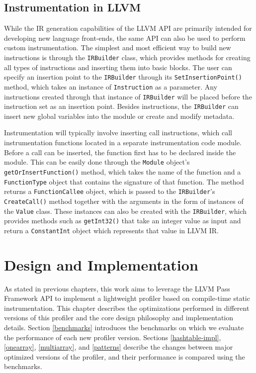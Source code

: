 \section{Instrumentation in LLVM}
While the IR generation capabilities of the LLVM API are primarily intended for developing new language front-ends, the same API can also be used to perform custom instrumentation. The simplest and most efficient way to build new instructions is through the \texttt{IRBuilder} class, which provides methods for creating all types of instructions and inserting them into basic blocks. The user can specify an insertion point to the \texttt{IRBuilder} through its \texttt{SetInsertionPoint()} method, which takes an instance of \texttt{Instruction} as a parameter. Any instructions created through that instance of \texttt{IRBuilder} will be placed before the instruction set as an insertion point. Besides instructions, the \texttt{IRBuilder} can insert new global variables into the module or create and modify metadata.

Instrumentation will typically involve inserting call instructions, which call instrumentation functions located in a separate instrumentation code module. Before a call can be inserted, the function first has to be declared inside the module. This can be easily done through the \texttt{Module} object's \texttt{getOrInsertFunction()} method, which takes the name of the function and a \texttt{FunctionType} object that contains the signature of that function. The method returns a \texttt{FunctionCallee} object, which is passed to the \texttt{IRBuilder}'s \texttt{CreateCall()} method together with the arguments in the form of instances of the \texttt{Value} class. These instances can also be created with the \texttt{IRBuilder}, which provides methods such as \texttt{getInt32()} that take an integer value as input and return a \texttt{ConstantInt} object which represents that value in LLVM IR. 


\chapter{Design and Implementation}
\label{implementation}

As stated in previous chapters, this work aims to leverage the LLVM Pass Framework API to implement a lightweight profiler based on compile-time static instrumentation. This chapter describes the optimizations performed in different versions of this profiler and the core design philosophy and implementation details. Section \ref{benchmarks} introduces the benchmarks on which we evaluate the performance of each new profiler version. Sections \ref{hashtable-impl}, \ref{onearray}, \ref{multiarray}, and \ref{patterns} describe the changes between major optimized versions of the profiler, and their performance is compared using the benchmarks.


